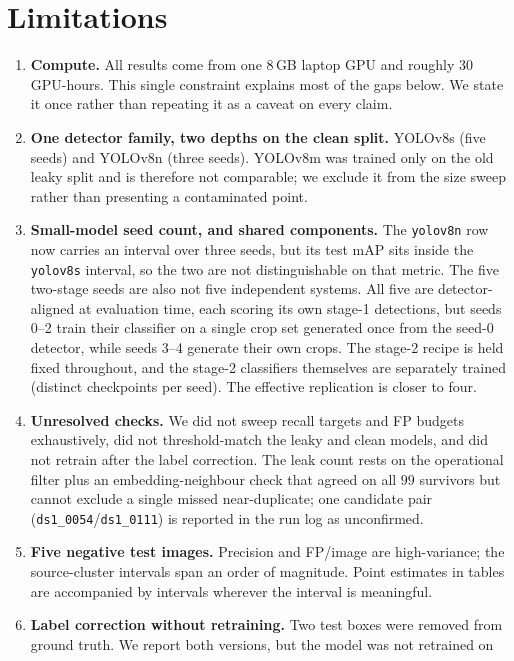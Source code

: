 \section{Limitations}
\label{sec:limitations}

\begin{enumerate}[leftmargin=1.4em,itemsep=2pt]
\item \textbf{Compute.} All results come from one $8$\,GB laptop GPU and roughly
$30$ GPU-hours. This single constraint explains most of the gaps below. We state
it once rather than repeating it as a caveat on every claim.
\item \textbf{One detector family, two depths on the clean split.} YOLOv8s
(five seeds) and YOLOv8n (three seeds). YOLOv8m was trained only on the old leaky
split and is therefore not comparable; we exclude it from the size sweep rather
than presenting a contaminated point.
\item \textbf{Small-model seed count, and shared components.} The \texttt{yolov8n}
row now carries an interval over three seeds, but its test mAP sits inside the
\texttt{yolov8s} interval, so the two are not distinguishable on that metric. The
five two-stage seeds are also not five independent systems. All five are
detector-aligned at evaluation time, each scoring its own stage-1 detections, but
seeds 0--2 train their classifier on a single crop set generated once from the
seed-0 detector, while seeds 3--4 generate their own crops. The stage-2 recipe is
held fixed throughout, and the stage-2 classifiers themselves are separately
trained (distinct checkpoints per seed). The effective replication is closer to
four.
\item \textbf{Unresolved checks.} We did not sweep recall targets and FP budgets
exhaustively, did not threshold-match the leaky and clean models, and did not
retrain after the label correction. The leak count rests on the operational
filter plus an embedding-neighbour check that agreed on all $99$ survivors but
cannot exclude a single missed near-duplicate; one candidate pair
(\texttt{ds1\_0054}/\texttt{ds1\_0111}) is reported in the run log as unconfirmed.
\item \textbf{Five negative test images.} Precision and FP/image are
high-variance; the source-cluster intervals span an order of magnitude. Point
estimates in tables are accompanied by intervals wherever the interval is
meaningful.
\item \textbf{Label correction without retraining.} Two test boxes were removed
from ground truth. We report both versions, but the model was not retrained on

\end{enumerate}
